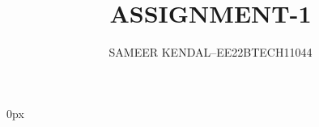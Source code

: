 \documentclass[journal,12pt,twocolumn]{IEEEtran}
\theoremstyle{remark}
\begin{document}
%
\parindent 0px



\vspace{3cm}

\title{
ASSIGNMENT-1
}
\author{ SAMEER KENDAL--EE22BTECH11044%
	
}	


%
%
%

% 
%



% 
\end{document}
